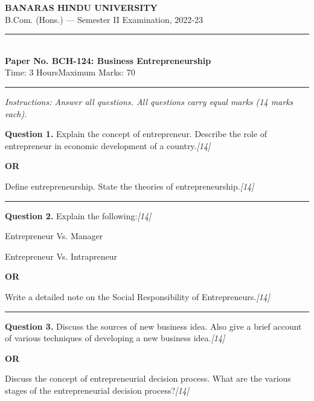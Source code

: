 \documentclass[11pt,a4paper]{article}
\newcommand{\pts}[1]{\hfill   \textit{[#1]}}
\begin{document}
\begin{center}
  {\large\bfseries BANARAS HINDU UNIVERSITY}\\[2pt]
  {\normalsize B.Com. (Hons.) --- Semester II Examination, 2022-23}\\[6pt]
  \rule{0.8\linewidth}{0.5pt}\\[6pt]
  {\large\bfseries Paper No. BCH-124: Business Entrepreneurship}\\[4pt]
  {\normalsize Time: 3 Hours\hfill Maximum Marks: 70}
\end{center}

\rule{\linewidth}{0.4pt}

\smallskip



\noindent   \textit{Instructions: Answer all questions. All questions carry equal marks (14 marks each).}

\bigskip




\noindent   \textbf{Question 1.}
Explain the concept of entrepreneur. Describe the role of entrepreneur in economic development of a country.\pts{14}

\centerline{   \textbf{OR}}

Define entrepreneurship. State the theories of entrepreneurship.\pts{14}

\medskip\rule{\linewidth}{0.2pt}




\noindent   \textbf{Question 2.}
Explain the following:\pts{14}

\begin{parts}
  \item Entrepreneur Vs. Manager
  \item Entrepreneur Vs. Intrapreneur
\end{parts}

\centerline{   \textbf{OR}}

Write a detailed note on the Social Responsibility of Entrepreneurs.\pts{14}

\medskip\rule{\linewidth}{0.2pt}




\noindent   \textbf{Question 3.}
Discuss the sources of new business idea. Also give a brief account of various techniques of developing a new business idea.\pts{14}

\centerline{   \textbf{OR}}

Discuss the concept of entrepreneurial decision process. What are the various stages of the entrepreneurial decision process?\pts{14}
\end{document}
